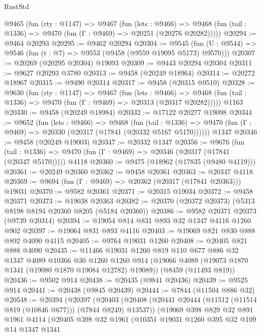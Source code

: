 \begin{lexlean}{RustStd}
\begin{coremodule}
  @9465
    (fun (rty : @1147) =>
    @9467
      (fun (lets : @9466) =>
      @9468 (fun (tail : @1336) => @9470 (fun (Γ : @9469) => @20251 (@20276 @20282)))))
@20294 := @9464 @20293
@20295 := @9462 @20294
@20304 := @9545
    (fun (U : @9544) => @9546 (fun (t : @7) => @9553 (@9458 (@9559 @19095 @5173) @9570)))
@20307 := @20269 (@20295 @20304) @19093
@20309 := @9443 @20294 @20304
@20311 := @9627 @20293 @3780
@20313 := @9458 (@20249 @18964)
@20314 := @20272 @18967
@20315 := @9490 @20314
@20317 := @9458 (@20315 @9510)
@20328 := @9630
    (fun (rty : @1147) =>
    @9467
      (fun (lets : @9466) =>
      @9468 (fun (tail : @1336) => @9470 (fun (Γ : @9469) => @20313 (@20317 @20282)))))
    @1163
@20330 := @9458 (@20249 @18984)
@20332 := @17122 @20277 @19098
@20344 := @9652
    (fun (lets : @9466) =>
    @9468
      (fun (tail : @1336) =>
      @9470 (fun (Γ : @9469) => @20330 (@20317 (@17841 (@20332 @5167 @5170))))))
    @1347
@20346 := @9458 (@20249 @19003)
@20347 := @20332 @1347
@20356 := @9676
    (fun (tail : @1336) => @9470 (fun (Γ : @9469) => @20346 (@20317 (@17841 (@20347 @5170)))))
    @4118
@20360 := @9475 (@18962 (@17835 (@9480 @4119)))
@20361 := @20249 @20360
@20362 := @9458 @20361
@20363 := @20347 @4118
@20369 := @9694 (fun (Γ : @9469) => @20362 (@20317 (@17841 @20363))) @19031
@20370 := @9582 @20361
@20371 := @20315 @19034
@20372 := @9458 @20371
@20373 := @19038 @20363
@20382 := @20370 (@20372 @20373) (@5313 @8198 @8194 @20360 @8205 (@5184 @20360))
@20386 := @9582 @20371 @20373 (@9739 @20314)
@20394 := @19054 @814 @831 @893 @32 @1347 @4116 @1260 @902
@20397 := @19064 @831 @893 @4116
@20403 := @19069 @821 @830 @888 @892 @4090 @4115
@20405 := @9764 @19031 @1260
@20408 := @20405 @821 @888 @4090
@20435 := @11466
    @19031
    @1260
    @819
    @110
    @677
    @886
    @32
    @1347
    @4089
    @10366
    @30
    @1260
    @1260
    @914
    (@19066 @4089 (@19073 @1870 @1341 (@19080 @1870 @19084 @12782) @19089))
    (@8459 (@11493 @819))
@20436 := @9502 @914
@20438 := @20435 (@9841 @20436)
@20439 := @9525 @914
@20441 := @20438 (@9845 @20439)
@20444 := @7844 (@11504 @886 @32)
@20548 := @20394
    (@20397
      (@20403
        (@20408 (@20441 @20444 (@11512 (@11514 @819 (@10846 @677))) (@7844 @8249) @13537))
        (@19069
          @398
          @829
          @32
          @891
          @1961
          @4114
          (@20405
            @398
            @32
            @1961
            (@10351
              @19031
              @1260
              @395
              @32
              @109
              @14
              @1347
              @1341

\end{coremodule}
\end{lexlean}
